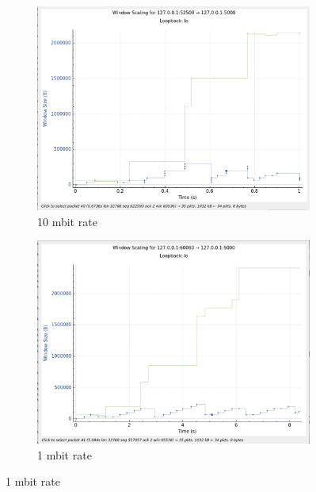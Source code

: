 \documentclass{report}
\begin{document}
\begin{figure}[H]
    \centering
    \begin{subfigure}[b]{0.45\textwidth}
        \centering
        \includegraphics[width=\textwidth]{Pics/Reno/r10mbit_s1m_ws}
        \caption{10 mbit rate }
    \end{subfigure}
    \hfill
    \begin{subfigure}[b]{0.45\textwidth}
        \centering
        \includegraphics[width=\textwidth]{Pics/Reno/r1mbit_s1m_ws}
        \caption{1 mbit rate}
    \end{subfigure}
    \medskip


\end{figure}
\end{document}
